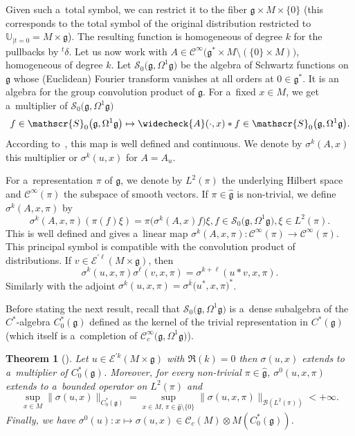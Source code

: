 \documentclass[pdftex]{sigma}
\newcommand{\tsp}[1]{{}^t \! #1} %
\newcommand{\CCC}{\mathscr{C}} %
\newcommand{\g}{\mathfrak{g}} %
\numberwithin{equation}{section}
\newtheorem{thm}{Theorem}[section]
\theoremstyle{definition}
\begin{document}
Given such a~total symbol, we can restrict it to the fiber $\g\times M \times \{0\}$ (this corresponds to the total symbol of the original distribution restricted to $\mathbb{U}_{|t=0} = M\times \g$). The resulting function is homogeneous of degree $k$ for the pullbacks by $\tsp\delta$. Let us now work with $A\in \CCC^{\infty}\bigl(\g^*\times M\setminus (\{0\}\times M)\bigr)$, homogeneous of degree $k$. Let $\mathscr{S}_0\bigl(\g, \Omega^1\g\bigr)$ be the algebra of Schwartz functions on $\g$ whose (Euclidean) Fourier transform vanishes at all orders at $0 \in \g^*$. It is an algebra for the group convolution product of $\g$. For a~fixed $x \in M$, we get a~multiplier of $\mathscr{S}_0\bigl(\g,\Omega^1\g\bigr)$
\[f \in \mathscr{S}_0\bigl(\g,\Omega^1\g\bigr) \mapsto \widecheck{A}(\cdot,x) \ast f \in \mathscr{S}_0\bigl(\g,\Omega^1\g\bigr).\]
According to~\cite[Proposition~2.2]{CGGP}, this map is well defined and continuous. We denote by $\sigma^k(A,x)$ this multiplier or $\sigma^k(u,x)$ for $A = A_u$.

For a~representation $\pi$ of $\g$, we denote by $L^2(\pi)$ the underlying Hilbert space and $\CCC^{\infty}(\pi)$ the subspace of smooth vectors.
If $\pi\in \widehat{\g}$ is non-trivial, we define $\sigma^k(A,x,\pi)$ by
\[\sigma^k(A,x,\pi)(\pi(f)\xi) = \pi\bigl(\sigma^k(A,x)f\bigr)\xi, f\in \mathscr{S}_0\bigl(\g,\Omega^1\g\bigr), \xi \in L^2(\pi).\]
This is well defined and gives a~linear map $\sigma^k(A,x,\pi) \colon \CCC^{\infty}(\pi) \to \CCC^{\infty}(\pi)$. This principal symbol is compatible with the convolution product of distributions. If $v\in \mathcal{E}^{'\ell}(M\times \g)$, then
\[\sigma^k(u,x,\pi)\sigma^{\ell}(v,x,\pi) = \sigma^{k+\ell}(u\ast v, x,\pi).\]
Similarly with the adjoint $\sigma^k(u,x,\pi) = \sigma^{\bar{k}}\bigl(u^*,x,\pi\bigr)^*$.

Before stating the next result, recall that $\mathcal{S}_0\bigl(\g,\Omega^1\g\bigr)$ is a~dense subalgebra of the $C^*$-algebra $C^*_0(\g)$ defined as the kernel of the trivial representation in $C^*(\g)$ (which itself is a~completion of $\CCC^{\infty}_c\bigl(\g,\Omega^1\g\bigr)$).

\begin{thm}[{\cite[Theorem 3.18]{AMYMaximalHypoellipticity}}] Let $u\in \mathcal{E}^{'k}(M\times \g)$ with $\Re(k)= 0$ then $\sigma(u,x)$ extends to a~multiplier of $C^*_0(\g)$. Moreover, for every non-trivial $\pi\in \hat{\g}$, $\sigma^0(u,x,\pi)$ extends to a~bounded operator on $L^2(\pi)$ and
\[\sup_{x\in M}\| \sigma(u,x)\|_{C^*_0(\g)} = \sup_{x\in M,\, \pi\in\widehat{\g}\setminus\{0\}} \|\sigma(u,x,\pi)\|_{\mathcal{B}(L^2(\pi))}<+\infty.\]
Finally, we have $\sigma^0(u) \colon x \mapsto \sigma(u,x) \in \CCC_c(M)\otimes M(C^*_0(\g))$.
\end{thm}
\end{document}

